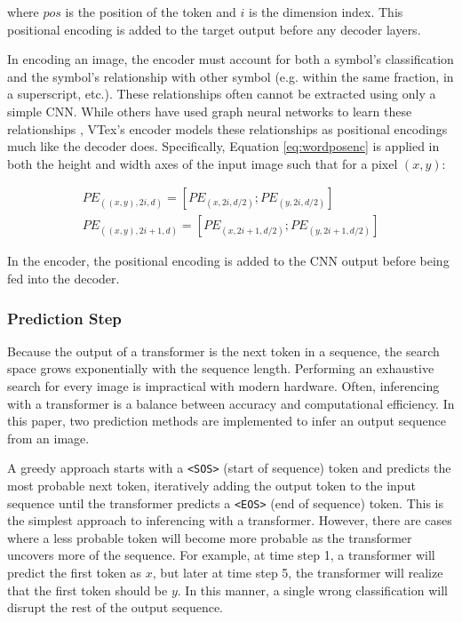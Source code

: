 where $pos$ is the position of the token and $i$ is the dimension index. This positional encoding is added to the target output before any decoder layers.

In encoding an image, the encoder must account for both a symbol's classification and the symbol's relationship with other symbol (e.g. within the same fraction, in a superscript, etc.). These relationships often cannot be extracted using only a simple CNN. While others have used graph neural networks to learn these relationships \cite{Peng2021}, VTex's encoder models these relationships as positional encodings much like the decoder does. Specifically, Equation \ref{eq:wordposenc} is applied in both the height and width axes of the input image such that for a pixel $(x,y)$:

\begin{equation} \label{eq:imgposenc}
\begin{split}
PE_{((x, y), 2i, d)} = [ PE_{(x, 2i, d/2)} ; PE_{(y,2i,d/2)} ] \\
PE_{((x, y), 2i+1, d)} = [ PE_{(x, 2i+1,d/2)} ; PE_{(y,2i+1,d/2)} ]
\end{split}
\end{equation}

In the encoder, the positional encoding is added to the CNN output before being fed into the decoder.

\subsubsection{Prediction Step}
Because the output of a transformer is the next token in a sequence, the search space grows exponentially with the sequence length. Performing an exhaustive search for every image is impractical with modern hardware. Often, inferencing with a transformer is a balance between accuracy and computational efficiency. In this paper, two prediction methods are implemented to infer an output sequence from an image. 

A greedy approach starts with a {\tt <SOS>} (start of sequence) token and predicts the most probable next token, iteratively adding the output token to the input sequence until the transformer predicts a {\tt <EOS>} (end of sequence) token. This is the simplest approach to inferencing with a transformer. However, there are cases where a less probable token will become more probable as the transformer uncovers more of the sequence. For example, at time step 1, a transformer will predict the first token as $x$, but later at time step 5, the transformer will realize that the first token should be $y$. In this manner, a single wrong classification will disrupt the rest of the output sequence.

